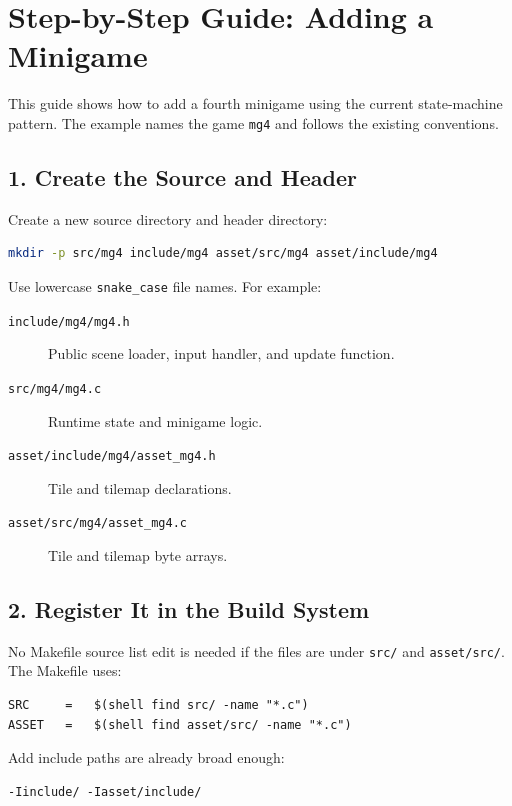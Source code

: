\chapter{Step-by-Step Guide: Adding a Minigame}

This guide shows how to add a fourth minigame using the current state-machine pattern. The example names the game \texttt{mg4} and follows the existing conventions.

\section{1. Create the Source and Header}

Create a new source directory and header directory:

\begin{lstlisting}[language=bash,caption={Create module directories}]
mkdir -p src/mg4 include/mg4 asset/src/mg4 asset/include/mg4
\end{lstlisting}

Use lowercase \texttt{snake\_case} file names. For example:

\begin{description}
  \item[\texttt{include/mg4/mg4.h}] Public scene loader, input handler, and update function.
  \item[\texttt{src/mg4/mg4.c}] Runtime state and minigame logic.
  \item[\texttt{asset/include/mg4/asset\_mg4.h}] Tile and tilemap declarations.
  \item[\texttt{asset/src/mg4/asset\_mg4.c}] Tile and tilemap byte arrays.
\end{description}

\section{2. Register It in the Build System}

No Makefile source list edit is needed if the files are under \texttt{src/} and \texttt{asset/src/}. The Makefile uses:

\begin{lstlisting}[caption={Existing Makefile source discovery}]
SRC     =   $(shell find src/ -name "*.c")
ASSET   =   $(shell find asset/src/ -name "*.c")
\end{lstlisting}

Add include paths are already broad enough:

\begin{lstlisting}[caption={Existing include flags}]
-Iinclude/ -Iasset/include/
\end{lstlisting}

